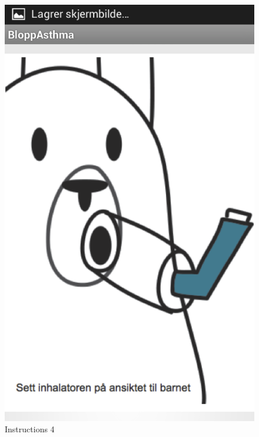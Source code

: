 \begin{figure}
	\begin{minipage}[b]{0.3\linewidth}
		\centering
		\includegraphics[width=0.20\paperwidth]{Pictures/app-screenshots/instructions-4.png}
		\caption{Instructions 4}
		\label{fig:instructions-4}
	\end{minipage}
	\begin{minipage}[b]{0.3\linewidth}
		\centering

\end{minipage}
\end{figure}
